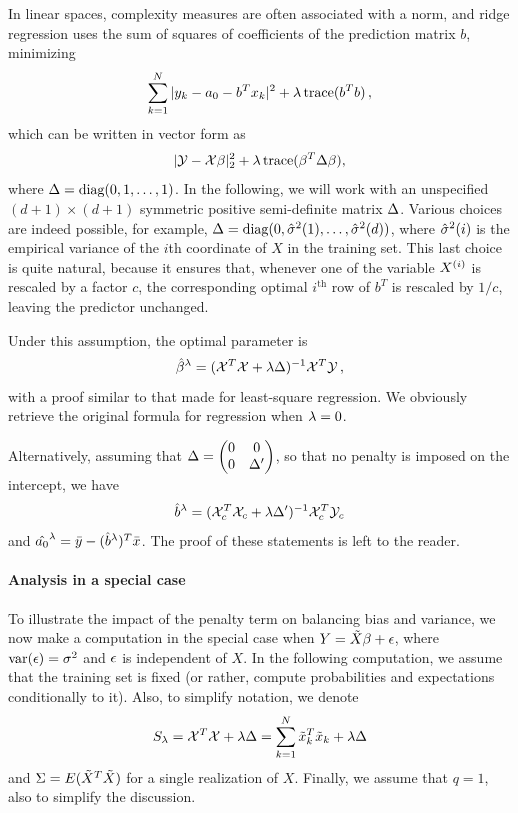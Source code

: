 In linear spaces,  complexity measures are often associated with a norm, and  ridge regression uses the sum of squares of coefficients of the prediction matrix $b$, minimizing
\begin{equation}
\label{eq:rr.1}
\sum_{k=1}^N |y_k - {a_0} - b^{T} x_k|^2 + \lambda\, {\mathrm{trace}}(b^{T}b)\,,
\end{equation}
which can be written in vector form as
\[
|{\mathcal Y} - {\mathcal X} \beta|_2^2 + \lambda\, {\mathrm{trace}}(\beta^T\Delta\beta),
\]
where $\Delta = \text{diag}(0, 1, \ldots, 1)$. In the following, we will work with an unspecified $(d+1)\times (d+1)$ symmetric positive semi-definite matrix $\Delta$. Various choices are indeed possible, for example, $\Delta = \text{diag}(0, \hat{\sigma}^2(1), \ldots, \hat{\sigma}^2(d))$, where $\hat{\sigma}^2(i)$ is the empirical variance of the $i$th coordinate of $X$ in the training set. This last choice is quite natural, because it ensures that, whenever one of the variable $X^{(i)} $ is rescaled by a factor $c$, the corresponding optimal $i^{\mathrm{th}}$ row of $b^T$ is rescaled by $1/c$, leaving the predictor unchanged.

Under this assumption, the optimal parameter is
\[
\hat{\beta}^\lambda = ({\mathcal X}^T{\mathcal X} + \lambda \Delta)^{-1}{\mathcal X}^T {\mathcal Y}\,,
\]
with a proof similar to that made for least-square regression. We obviously retrieve the original formula for regression when
$\lambda=0$. 

Alternatively, assuming that $\Delta = \begin{pmatrix} 0&0\\0&\Delta'\end{pmatrix}$, so that no penalty is imposed on the intercept, we have
\begin{equation}
\label{eq:ridge.2.form}
\hat b^\lambda = ({\mathcal X}_c^T{\mathcal X}_c + \lambda \Delta')^{-1}{\mathcal X}_c^T {\mathcal Y}_c
\end{equation}
and $\hat{a_0}^\lambda = \bar y - (\hat b^\lambda)^T \bar x$. The proof of these statements is left to the reader.
\bigskip

\paragraph{Analysis in a special case}
To illustrate the impact of the penalty term on balancing bias and variance, we now make a computation in the special case when $Y = \tilde X\beta + \epsilon$, where $\mathrm{var}(\epsilon) = \sigma^2$ and $\epsilon$ is independent of $X$. In the following computation, we assume that the training set is fixed (or rather, compute 
 probabilities and expectations 
conditionally to it).
Also, to simplify notation, we
denote
$$
S_\lambda = {\mathcal X}^T{\mathcal X} + \lambda \Delta = \sum_{k=1}^N {\tilde{x}}_k^T{\tilde{x}}_k + \lambda\Delta
$$
and 
$\Sigma = E({\tilde{X}}^T{\tilde{X}})$ for a single realization of $X$. Finally, we assume that $q=1$, also to simplify the discussion.

